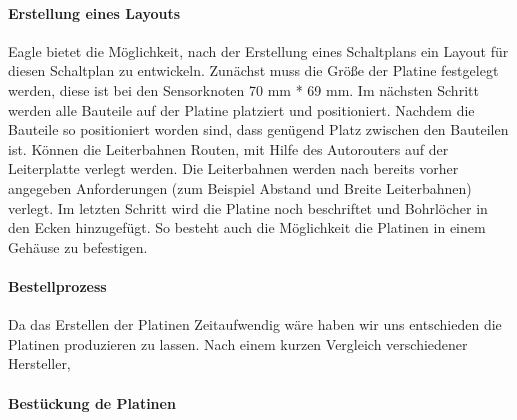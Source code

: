 \paragraph{Erstellung eines Layouts} Eagle bietet die Möglichkeit, nach der Erstellung eines Schaltplans ein Layout für diesen Schaltplan zu entwickeln. Zunächst muss die Größe der Platine festgelegt werden, diese ist bei den Sensorknoten 70 mm * 69 mm. Im nächsten Schritt werden alle Bauteile auf der Platine platziert und positioniert. Nachdem die Bauteile so positioniert worden sind, dass genügend Platz zwischen den Bauteilen ist. Können die Leiterbahnen Routen, mit Hilfe des Autorouters auf der Leiterplatte verlegt werden. Die Leiterbahnen werden nach bereits vorher angegeben Anforderungen (zum Beispiel Abstand und Breite Leiterbahnen) verlegt. Im letzten Schritt wird die Platine noch beschriftet und Bohrlöcher in den Ecken hinzugefügt. So besteht auch die Möglichkeit die Platinen in einem Gehäuse zu befestigen. 
\paragraph{Bestellprozess} Da das Erstellen der Platinen Zeitaufwendig wäre haben wir uns entschieden die Platinen produzieren zu lassen. Nach einem kurzen Vergleich verschiedener Hersteller, 
\paragraph{Bestückung de Platinen}
